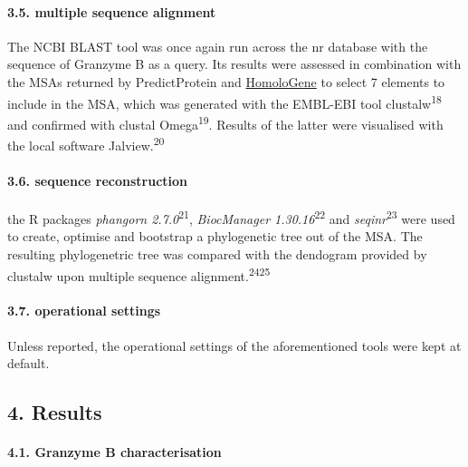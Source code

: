\documentclass[
]{article}
\begin{document}
\hypertarget{multiple-sequence-alignment}{%
\paragraph{3.5. multiple sequence alignment}\label{multiple-sequence-alignment}}

The NCBI BLAST tool was once again run across the nr database with the sequence of Granzyme B as a query. Its results were assessed in combination with the MSAs returned by PredictProtein and \href{https://www.ncbi.nlm.nih.gov/homologene}{HomoloGene} to select 7 elements to include in the MSA, which was generated with the EMBL-EBI tool clustalw\textsuperscript{18} and confirmed with clustal Omega\textsuperscript{19}. Results of the latter were visualised with the local software Jalview.\textsuperscript{20}

\hypertarget{sequence-reconstruction}{%
\paragraph{3.6. sequence reconstruction}\label{sequence-reconstruction}}

the R packages \emph{phangorn 2.7.0}\textsuperscript{21}, \emph{BiocManager 1.30.16}\textsuperscript{22} and \emph{seqinr}\textsuperscript{23} were used to create, optimise and bootstrap a phylogenetic tree out of the MSA. The resulting phylogenetric tree was compared with the dendogram provided by clustalw upon multiple sequence alignment.\textsuperscript{24}\textsuperscript{25}

\hypertarget{operational-settings}{%
\paragraph{3.7. operational settings}\label{operational-settings}}

Unless reported, the operational settings of the aforementioned tools were kept at default.

\hypertarget{results}{%
\subsection*{4. Results}\label{results}}

\hypertarget{granzyme-b-characterisation}{%
\paragraph{4.1. Granzyme B characterisation}\label{granzyme-b-characterisation}}
\end{document}
